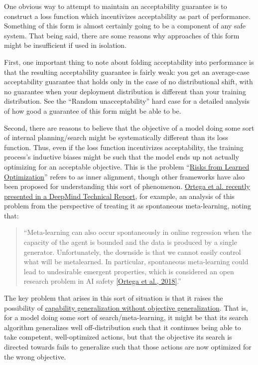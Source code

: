 \documentclass{amsart}
\begin{document}
One obvious way to attempt to maintain an acceptability guarantee is to construct a loss function which incentivizes acceptability as part of performance. Something of this form is almost certainly going to be a component of any safe system. That being said, there are some reasons why approaches of this form might be insufficient if used in isolation.

First, one important thing to note about folding acceptability into performance is that the resulting acceptability guarantee is fairly weak: you get an average-case acceptability guarantee that holds only in the case of no distributional shift, with no guarantee when your deployment distribution is different than your training distribution. See the ``Random unacceptability'' hard case for a detailed analysis of how good a guarantee of this form might be able to be.

Second, there are reasons to believe that the objective of a model doing some sort of internal planning/search might be systematically different than its loss function. Thus, even if the loss function incentivizes acceptability, the training process's inductive biases might be such that the model ends up not actually optimizing for an acceptable objective. This is the problem ``\href{https://arxiv.org/abs/1906.01820}{Risks from Learned Optimization}'' refers to as inner alignment, though other frameworks have also been proposed for understanding this sort of phenomenon. \href{https://arxiv.org/abs/1905.03030}{Ortega et al. recently presented in a DeepMind Technical Report}, for example, an analysis of this problem from the perspective of treating it as spontaneous meta-learning, noting that:
\begin{quote}
    ``Meta-learning can also occur spontaneously in online regression when the capacity of the agent is bounded and the data is produced by a single generator. Unfortunately, the downside is that we cannot easily control what will be metalearned. In particular, spontaneous meta-learning could lead to undesirable emergent properties, which is considered an open research problem in AI safety \href{https://medium.com/@deepmindsafetyresearch/building-safe-artificial-intelligence-52f5f75058f1}{[Ortega et al., 2018]}.''
\end{quote}
The key problem that arises in this sort of situation is that it raises the possibility of \href{https://www.alignmentforum.org/posts/2mhFMgtAjFJesaSYR/2-d-robustness}{capability generalization without objective generalization}. That is, for a model doing some sort of search/meta-learning, it might be that its search algorithm generalizes well off-distribution such that it continues being able to take competent, well-optimized actions, but that the objective its search is directed towards fails to generalize such that those actions are now optimized for the wrong objective.
\end{document}
